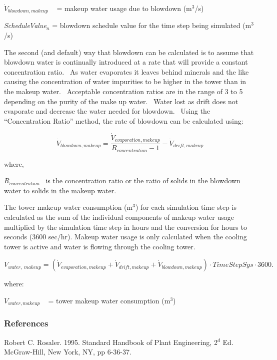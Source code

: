 \({\dot V_{blowdown,makeup}}\) ~ = makeup water usage due to blowdown (m\(^{3}\)/s)

\emph{ScheduleValue\(_{n}\)} = blowdown schedule value for the time step being simulated (m\(^{3}\)/s)

The second (and default) way that blowdown can be calculated is to assume that blowdown water is continually introduced at a rate that will provide a constant concentration ratio.~ As water evaporates it leaves behind minerals and the like causing the concentration of water impurities to be higher in the tower than in the makeup water.~ Acceptable concentration ratios are in the range of 3 to 5 depending on the purity of the make up water.~ Water lost as drift does not evaporate and decrease the water needed for blowdown.~ Using the ``Concentration Ratio'' method, the rate of blowdown can be calculated using:

\begin{equation}
{\dot V_{blowdown,makeup}} = \frac{{{{\dot V}_{evaporation,makeup}}}}{{{R_{concentration}} - 1}} - {\dot V_{drift,makeup}}
\end{equation}

where,

\({R_{concentration}}\) ~is the concentration ratio or the ratio of solids in the blowdown water to solids in the makeup water.

The tower makeup water consumption (m\(^{3}\)) for each simulation time step is calculated as the sum of the individual components of makeup water usage multiplied by the simulation time step in hours and the conversion for hours to seconds (3600 sec/hr). Makeup water usage is only calculated when the cooling tower is active and water is flowing through the cooling tower.

\begin{equation}
{V_{water,\;makeup}} = \left( {{{\dot V}_{evaporation,makeup}} + {{\dot V}_{drift,makeup}} + {{\dot V}_{blowdown,makeup}}} \right)\cdot TimeStepSys\cdot 3600.
\end{equation}

where:

\({V_{water,makeup}}\) ~ = tower makeup water consumption (m\(^{3}\))

\subsubsection{References}\label{references-2-003}

Robert C. Rosaler. 1995. Standard Handbook of Plant Engineering, 2\(^{d}\) Ed. McGraw-Hill, New York, NY, pp 6-36-37.

